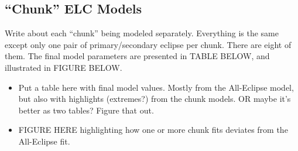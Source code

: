 \subsection{``Chunk'' ELC Models}
Write about each ``chunk'' being modeled separately. Everything is the same except only one pair of primary/secondary eclipse per chunk. There are eight of them. The final model parameters are presented in TABLE BELOW, and illustrated in FIGURE BELOW.

\begin{itemize}
\item Put a table here with final model values. Mostly from the All-Eclipse model, but also with highlights (extremes?) from the chunk models. OR maybe it's better as two tables? Figure that out.
\item FIGURE HERE highlighting how one or more chunk fits deviates from the All-Eclipse fit.
\end{itemize}